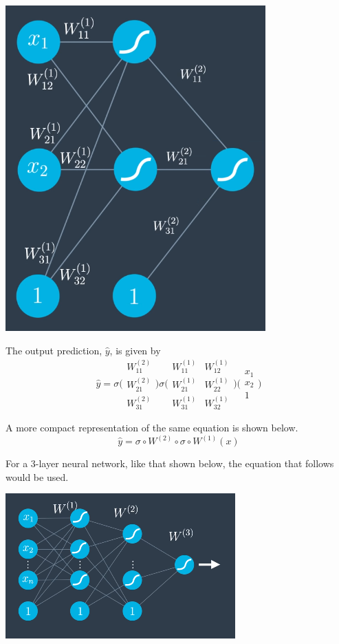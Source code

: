 \includegraphics[width=0.75\linewidth]{img//intro//introNN/neural-network-architecture-18.png}

The output prediction, \(\hat{y}\), is given by \[\hat{y} = \sigma \Bigg( \begin{matrix}W_{11}^{(2)} \\ W_{21}^{(2)} \\ W_{31}^{(2)}  \end{matrix} \Bigg) \sigma \Bigg( \begin{matrix}W_{11}^{(1)} & W_{12}^{(1)} \\ W_{21}^{(1)} & W_{22}^{(1)} \\ W_{31}^{(1)} & W_{32}^{(1)}  \end{matrix} \Bigg) \Bigg( \begin{matrix}x_1 \\ x_2 \\ 1 \end{matrix} \Bigg)\]

A more compact representation of the same equation is shown below. \[\hat{y} = \sigma \circ W^{(2)} \circ \sigma \circ W^{(1)}(x)\]

For a 3-layer neural network, like that shown below, the equation that follows would be used.

\includegraphics[width=0.75\linewidth]{img//intro//introNN/neural-network-architecture-19.png}


